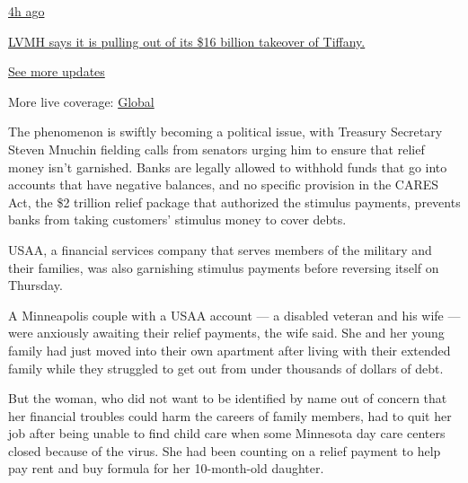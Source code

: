 \href{https://www.nytimes3xbfgragh.onion/live/2020/09/09/business/stock-market-today-coronavirus?action=click\&pgtype=Article\&state=default\&region=MAIN_CONTENT_1\&context=storylines_live_updates\#lvmh-says-it-is-pulling-out-of-its-16-billion-takeover-of-tiffany}{4h
ago}

\href{https://www.nytimes3xbfgragh.onion/live/2020/09/09/business/stock-market-today-coronavirus?action=click\&pgtype=Article\&state=default\&region=MAIN_CONTENT_1\&context=storylines_live_updates\#lvmh-says-it-is-pulling-out-of-its-16-billion-takeover-of-tiffany}{LVMH
says it is pulling out of its \$16 billion takeover of Tiffany.}

\href{https://www.nytimes3xbfgragh.onion/live/2020/09/09/business/stock-market-today-coronavirus?action=click\&pgtype=Article\&state=default\&region=MAIN_CONTENT_1\&context=storylines_live_updates}{See
more updates}

More live coverage:
\href{https://www.nytimes3xbfgragh.onion/2020/09/09/world/covid-19-coronavirus.html?action=click\&pgtype=Article\&state=default\&region=MAIN_CONTENT_1\&context=storylines_live_updates}{Global}

The phenomenon is swiftly becoming a political issue, with Treasury
Secretary Steven Mnuchin fielding calls from senators urging him to
ensure that relief money isn't garnished. Banks are legally allowed to
withhold funds that go into accounts that have negative balances, and no
specific provision in the CARES Act, the \$2 trillion relief package
that authorized the stimulus payments, prevents banks from taking
customers' stimulus money to cover debts.

USAA, a financial services company that serves members of the military
and their families, was also garnishing stimulus payments before
reversing itself on Thursday.

A Minneapolis couple with a USAA account --- a disabled veteran and his
wife --- were anxiously awaiting their relief payments, the wife said.
She and her young family had just moved into their own apartment after
living with their extended family while they struggled to get out from
under thousands of dollars of debt.

But the woman, who did not want to be identified by name out of concern
that her financial troubles could harm the careers of family members,
had to quit her job after being unable to find child care when some
Minnesota day care centers closed because of the virus. She had been
counting on a relief payment to help pay rent and buy formula for her
10-month-old daughter.

